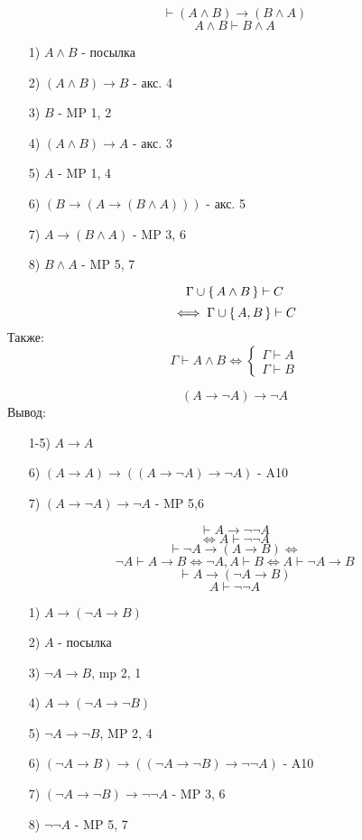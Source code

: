 \begin{example}
\[
\vdash (A \land B) \rightarrow (B \land A)
\]
\[
A \land B \vdash B \land A
\]
\begin{itemize}
  \item [1) ] $A \land B$ - посылка
  \item [2) ] $(A \land B) \rightarrow B$ - акс. 4
  \item [3) ] $B$ - MP 1, 2
  \item [4) ] $(A \land B) \rightarrow A$ - акс. 3
  \item [5) ] $A$ - MP 1, 4
  \item [6) ] $(B \rightarrow (A \rightarrow (B \land A)))$ - акс. 5
  \item [7) ] $A \rightarrow (B \land A)$ - MP 3, 6
  \item [8) ] $B \land A$ - MP 5, 7
\end{itemize}
\end{example}
\begin{lemma}
\[
\Gamma \cup \set{A \land B} \vdash C
\]
\[
\iff \Gamma \cup \set{A, B} \vdash C
\]
Также:
\[
\Gamma \vdash A \land B \iff \begin{cases}
\Gamma \vdash A \\
\Gamma \vdash B
\end{cases}
\]
\end{lemma}
\begin{example}
  \[
    (A \rightarrow \neg A) \rightarrow \neg A 
  \]
  Вывод: 
  \begin{itemize}
    \item [1-5)] $A \rightarrow A$
    \item [6)] $(A \rightarrow A) \rightarrow ((A \rightarrow \neg A) \rightarrow \neg A)$ - A10
    \item [7) ] $(A \rightarrow \neg A) \rightarrow \neg A$ - MP 5,6
  \end{itemize}
\end{example}
\begin{example}
\[
\vdash A \rightarrow \neg \neg A
\]
\[
\iff A \vdash \neg \neg A
\]
\[
  \vdash \neg A \rightarrow (A \rightarrow B) \iff
\]
\[
  \neg A \vdash A \rightarrow B \iff \neg A, A \vdash B \iff A \vdash \neg A \rightarrow B
\]
\[
  \vdash A \rightarrow (\neg A \rightarrow B)
\]
\[
  A \vdash \neg \neg A
\]
\begin{itemize}
  \item [1) ] $A \rightarrow (\neg A \rightarrow B)$
  \item [2) ] $A$ - посылка
  \item [3) ] $\neg A \rightarrow B$, mp 2, 1
  \item [4) ] $A \rightarrow (\neg A \rightarrow \neg B)$
  \item [5) ] $\neg A \rightarrow \neg B$, MP 2, 4
  \item [6) ] $(\neg A \rightarrow B) \rightarrow ((\neg A \rightarrow \neg B) \rightarrow \neg \neg A)$ - A10
  \item [7) ] $(\neg A \rightarrow \neg B) \rightarrow \neg \neg A$ - MP 3, 6
  \item [8) ] $\neg \neg A$ - MP 5, 7
\end{itemize}
\end{example}
